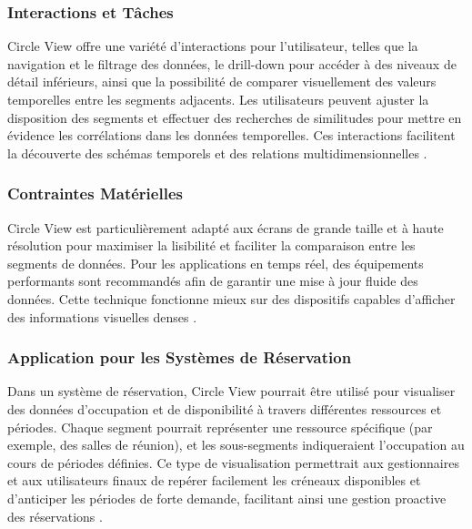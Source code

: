 \documentclass[runningheads]{llncs}
\begin{document}
\subsubsection{Interactions et Tâches}
Circle View offre une variété d'interactions pour l'utilisateur, telles que la navigation et le filtrage des données, le drill-down pour accéder à des niveaux de détail inférieurs, ainsi que la possibilité de comparer visuellement des valeurs temporelles entre les segments adjacents. Les utilisateurs peuvent ajuster la disposition des segments et effectuer des recherches de similitudes pour mettre en évidence les corrélations dans les données temporelles. Ces interactions facilitent la découverte des schémas temporels et des relations multidimensionnelles \cite{keim_circleview_2004}.


\subsubsection{Contraintes Matérielles}
Circle View est particulièrement adapté aux écrans de grande taille et à haute résolution pour maximiser la lisibilité et faciliter la comparaison entre les segments de données. Pour les applications en temps réel, des équipements performants sont recommandés afin de garantir une mise à jour fluide des données. Cette technique fonctionne mieux sur des dispositifs capables d'afficher des informations visuelles denses \cite{keim_circleview_2004}.

\subsubsection{Application pour les Systèmes de Réservation}
Dans un système de réservation, Circle View pourrait être utilisé pour visualiser des données d'occupation et de disponibilité à travers différentes ressources et périodes. Chaque segment pourrait représenter une ressource spécifique (par exemple, des salles de réunion), et les sous-segments indiqueraient l'occupation au cours de périodes définies. Ce type de visualisation permettrait aux gestionnaires et aux utilisateurs finaux de repérer facilement les créneaux disponibles et d'anticiper les périodes de forte demande, facilitant ainsi une gestion proactive des réservations \cite{keim_circleview_2004}.
\end{document}
